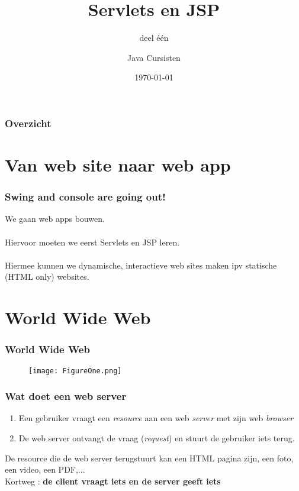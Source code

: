 \documentclass{beamer}
\title{Servlets en JSP}
\subtitle{deel \'e\'en}
\author{Java Cursisten}
\institute{INTEC Brussel}
\date{\today}
\begin{document}
\begin{frame}

\titlepage

\end{frame}


\begin{frame}

\frametitle{Overzicht}
\tableofcontents

\end{frame}


\section{Van web site naar web app}


\begin{frame}

\frametitle{Swing and console are going out!}

{\LARGE We gaan web apps bouwen.\\~\\

Hiervoor moeten we eerst Servlets en JSP leren.\\~\\

Hiermee kunnen we dynamische, interactieve web sites maken ipv statische (HTML only) websites.}

\end{frame}


\section{World Wide Web}


\begin{frame}

\frametitle{World Wide Web}

\begin{figure}

\texttt{[image: FigureOne.png]}

\end{figure}

\end{frame}


\begin{frame}

\frametitle{Wat doet een web server}

{\Large \begin{enumerate}
  \item Een gebruiker vraagt een \textit{resource} aan een web \textit{server} met zijn web \textit{browser}
  \item De web server ontvangt de vraag (\textit{request}) en stuurt de gebruiker iets terug.
\end{enumerate}

De resource die de web server terugstuurt kan een HTML pagina zijn, een foto, een video, een PDF,...\\
Kortweg : \textbf{de client vraagt iets en de server geeft iets}}

\end{frame}
\end{document}
